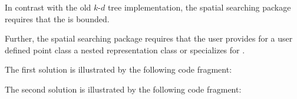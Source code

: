 In contrast with the old $k$-$d$ tree implementation, the spatial searching package
requires that the  is bounded.

Further, the spatial searching package requires that the user provides for a user defined point class  
a nested representation
class  or specializes  for .

The first solution is illustrated by the following code fragment:


The second solution is illustrated by the following code fragment:

